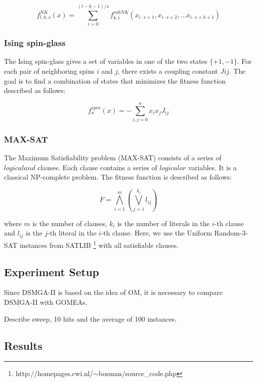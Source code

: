 \documentclass{sig-alternate-05-2015}
\begin{document}
\begin{displaymath}
f_{l,k,s}^{NK}(x) = \sum_{i=0}^{(l-k-1)/s} f_{k,i}^{subNK} (x_{i{\cdot}s+1},x_{i{\cdot}s+2},...x_{i{\cdot}s+k+1})
\end{displaymath}


\subsubsection{Ising spin-glass}
The Ising spin-glass gives a set of variables in one of the two states $\{+1, -1\}$. For each pair of neighboring spins $i$ and $j$, there exists a coupling constant $Jij$. The goal is to find a combination of states that minimizes the fitness function described as follows:

\begin{displaymath}
f_{n}^{spin}(x) = -\sum_{i,j=0}^{n} x_{i}x_{j}J_{ij}
\end{displaymath}


\subsubsection{MAX-SAT}
The Maximum Satisfiability problem (MAX-SAT) consists of a series of $logical and$ clauses. Each clause contains a series of $logical or$ variables. It is a classical NP-complete problem. The fitness function is described as follows:  

\begin{displaymath}
F = \bigwedge_{i=1}^{m} \left (\bigvee_{j=1}^{k_{i}} l_{ij} \right )
\end{displaymath}

where $m$ is the number of clauses, $k_i$ is the number of literals in the $i$-th clause and $l_{ij}$ is the $j$-th literal in the $i$-th clause. Here, we use the Uniform Random-3-SAT instances from SATLIB \footnote{http://homepages.cwi.nl/$\sim$bosman/source\_code.php} with all satisfiable clauses.  


\subsection{Experiment Setup}
Since DSMGA-II is based on the idea of OM, it is necessary to compare DSMGA-II with GOMEAs. 


Describe sweep, 10 hits and the average of 100 instances.



\subsection{Results}
\end{document}
